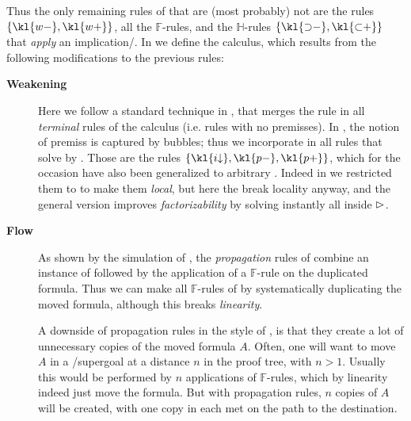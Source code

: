 \begin{scope}
Thus the only remaining rules of  that are (most probably) not
 are the  rules $\{\kl{w{-}},\kl{w{+}}\}$, all the
$\mathbb{F}$-rules, and the $\mathbb{H}$-rules $\{\kl{{\limp}{-}},
\kl{{\lsub}{+}}\}$ that \emph{apply} an implication/.
In  we define the  calculus, which results
from the following modifications to the previous rules:
\begin{description}
  \item[\textbf{Weakening}]
    Here we follow a standard technique in , that merges
    the  rule in all \emph{terminal} rules of the calculus (i.e.
    rules with no premisses). In , the notion of premiss is
    captured by  bubbles; thus we incorporate  in all
    rules that solve  by  .
    Those are the rules $\{\kl{i{\da}},\kl{p{-}},\kl{p{+}}\}$, which for the
    occasion have also been generalized to arbitrary . Indeed in
     we restricted them to   to make
    them \emph{local}, but here the  break locality anyway, and
    the general version improves \emph{factorizability} by solving instantly all
     inside $\mathbin{\rhd}$.

  \item[\textbf{Flow}]
    As shown by the simulation of , the
    \emph{propagation} rules of  combine an instance of
    \emph{} followed by the application of a $\mathbb{F}$-rule
    on the duplicated formula. Thus we can make all $\mathbb{F}$-rules of
      by systematically duplicating the moved
    formula, although this breaks \emph{linearity}.

    A downside of propagation rules in the style of , is that they
    create a lot of unnecessary copies of the moved formula $A$. Often, one will
    want to move $A$ in a /supergoal at a distance $n$ in the proof tree,
    with $n > 1$. Usually this would be performed by $n$ applications of
    $\mathbb{F}$-rules, which by linearity indeed just move the formula. But with
    propagation rules, $n$ copies of $A$ will be created, with one copy in each
     met on the path to the destination.


\end{description}
\end{scope}
